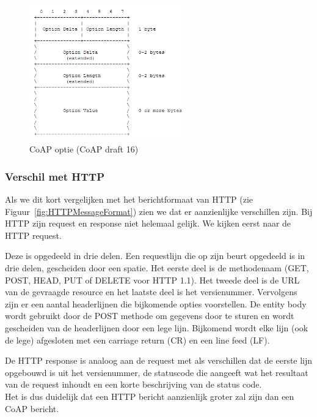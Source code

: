 \begin{figure}[h]
\centering
\includegraphics[width=0.6\textwidth]{fig/CoAPOpties}
\vspace{-10pt}
\caption{CoAP optie (CoAP draft 16)}
\label{fig:CoAPOpties}
\end{figure}

\newpage

\subsubsection{Verschil met HTTP}

Als we dit kort vergelijken met het berichtformaat van HTTP (zie Figuur~\ref{fig:HTTPMessageFormat}) zien we dat er aanzienlijke verschillen zijn. Bij HTTP zijn request en response niet helemaal gelijk. We kijken eerst naar de HTTP request.

Deze is opgedeeld in drie delen. Een requestlijn die op zijn beurt opgedeeld is in drie delen, gescheiden door een spatie. Het eerste deel is de methodenaam (GET, POST, HEAD, PUT of DELETE voor HTTP 1.1). Het tweede deel is de URL van de gevraagde resource en het laatste deel is het versienummer. Vervolgens zijn er een aantal headerlijnen die bijkomende opties voorstellen. De entity body wordt gebruikt door de POST methode om gegevens door te sturen en wordt gescheiden van de headerlijnen door een lege lijn. Bijkomend wordt elke lijn (ook de lege) afgesloten met een carriage return (CR) en een line feed (LF).

De HTTP response is analoog aan de request met als verschillen dat de eerste lijn opgebouwd is uit het versienummer, de statuscode die aangeeft wat het resultaat van de request inhoudt en een korte beschrijving van de status code.\\
Het is dus duidelijk dat een HTTP bericht aanzienlijk groter zal zijn dan een CoAP bericht.

